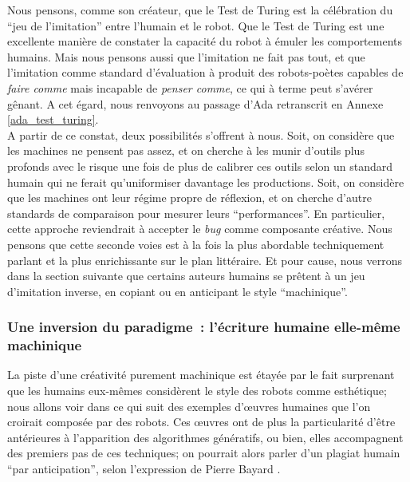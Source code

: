 \documentclass{article}
\begin{document}
					Nous pensons, comme son créateur, que le Test de Turing est la célébration du ``jeu de l'imitation'' entre l'humain et le robot. Que le Test de Turing est une excellente manière de constater la capacité du robot à émuler les comportements humains. Mais nous pensons aussi que l'imitation ne fait pas tout, et que l'imitation comme standard d'évaluation à produit des robots-poètes capables de \textit{faire comme} mais incapable de \textit{penser comme}, ce qui à terme peut s'avérer gênant. A cet égard, nous renvoyons au passage d'Ada retranscrit en Annexe \ref{ada_test_turing}.\\
					
					A partir de ce constat, deux possibilités s'offrent à nous. Soit, on considère que les machines ne pensent pas assez, et on cherche à les munir d'outils plus profonds avec le risque une fois de plus de calibrer ces outils selon un standard humain qui ne ferait qu'uniformiser davantage les productions. Soit, on considère que les machines ont leur régime propre de réflexion, et on cherche d'autre standards de comparaison pour mesurer leurs ``performances''. En particulier, cette approche reviendrait à accepter le \textit{bug} comme composante créative. Nous pensons que cette seconde voies est à la fois la plus abordable techniquement parlant et la plus enrichissante sur le plan littéraire. Et pour cause, nous verrons dans la section suivante que certains auteurs humains se prêtent à un jeu d'imitation inverse, en copiant ou en anticipant le style ``machinique''.
					
			\subsubsection{Une inversion du paradigme~: l'écriture humaine elle-même machinique} \label{inversion_paradigme}
				La piste d'une créativité purement machinique est étayée par le fait surprenant que les humains eux-mêmes considèrent le style des robots comme esthétique; nous allons voir dans ce qui suit des exemples d'œuvres humaines que l'on croirait composée par des robots. Ces œuvres ont de plus la particularité d'être antérieures à l'apparition des algorithmes génératifs, ou bien, elles accompagnent des premiers pas de ces techniques; on pourrait alors parler d'un plagiat humain ``par anticipation'', selon l'expression de Pierre Bayard \cite{bayard2002}.
				
\end{document}
